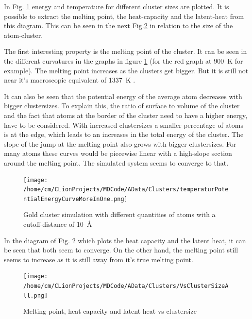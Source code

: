 \par 
In Fig.  \ref{GoldClusterSimulationTemperaturEnergy4In1} energy and temperature for different cluster sizes are plotted. 
It is possible to extract the melting point, the heat-capacity and the latent-heat from this diagram. 
This can be seen in the next Fig.\ref{GoldClusterSimulationVsClustersize} in relation to the size of the atom-cluster.
\par 
The first interesting property is the melting point of the cluster. It can be seen in the different curvatures in the graphs in figure \ref{GoldClusterSimulationTemperaturEnergy4In1} (for the red graph at 900~K for example). 
The melting point increases as the clusters get bigger. 
But it is still not near it's macroscopic equivalent of 1337~K \cite{Kurzweil2015}. %
\par
It can also be seen that the potential energy of the average atom decreases with bigger clustersizes. 
To explain this, the ratio of surface to volume of the cluster and the fact that atoms at the border of the cluster need to have a higher energy, have to be considered. 
With increased clustersizes a smaller percentage of atoms is at the edge, which leads to an increases in the total energy of the cluster. 
The slope of the jump at the melting point also grows with bigger clustersizes. 
For many atoms these curves would be piecewise linear with a high-slope section around the melting point. 
The simulated system seems to converge to that. 

\begin{figure}
	\begin{center} 
		\texttt{[image: /home/cm/CLionProjects/MDCode/AData/Clusters/temperaturPotentialEnergyCurveMoreInOne.png]} 
	\end{center} 
	\caption[Gold cluster simulation]{Gold cluster simulation with different quantities of atoms with a cutoff-distance of 10~\r{A}} 
	\label{GoldClusterSimulationTemperaturEnergy4In1} 
\end{figure} 

In the diagram of Fig. \ref{GoldClusterSimulationVsClustersize} which plots the heat capacity and the latent heat, it can be seen that both seem to converge. On the other hand, the melting point still seems to increase as it is still away from it's true melting point.

\begin{figure}
	\begin{center} 
		\texttt{[image: /home/cm/CLionProjects/MDCode/AData/Clusters/VsClusterSizeAll.png]} 
	\end{center} 
	\caption[Melting point, heat capacity and latent heat vs clustersize]{Melting point, heat capacity and latent heat vs clustersize} 
	\label{GoldClusterSimulationVsClustersize} 
\end{figure} 
